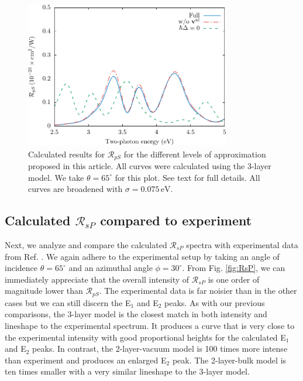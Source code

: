 \documentclass[11pt]{book}
\begin{document}
\begin{figure}
\centering
\includegraphics[width=0.8\textwidth]{../figures/04-results/fig-4_4_03}
\caption{Calculated results for $\mathcal{R}_{pS}$ for the
different levels of approximation proposed in this article. All curves were
calculated using the 3-layer model. We take $\theta=65^{\circ}$ for this plot.
See text for full details. All curves are broadened with
$\sigma=0.075\,\text{eV}$.
\label{fig:improvements}}
\end{figure}



\subsection{Calculated \texorpdfstring{$\mathcal{R}_{sP}$}{RsP} compared to experiment}\label{sec:RsP}

Next, we analyze and compare the calculated $\mathcal{R}_{sP}$ spectra with experimental data from Ref. \cite{mejiaPRB02}. We again adhere to the experimental setup by taking an angle of incidence $\theta=65^{\circ}$ and an azimuthal angle $\phi=30^\circ$. From Fig. \ref{fig:RsP}, we can immediately appreciate that the overall intensity of $\mathcal{R}_{sP}$ is one order of magnitude lower than $\mathcal{R}_{pS}$. The experimental data is far noisier than in the other cases but we can still discern the E$_{1}$ and E$_{2}$ peaks. As with our previous comparisons, the 3-layer model is the closest match in both intensity and lineshape to the experimental spectrum. It produces a curve that is very close to the experimental intensity with good proportional heights for the calculated E$_{1}$ and E$_{2}$ peaks. In contrast, the 2-layer-vacuum model is 100 times more intense than experiment and produces an enlarged E$_{2}$ peak. The 2-layer-bulk model is ten times smaller with a very similar lineshape to the 3-layer model.
\end{document}
